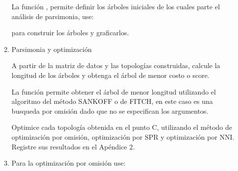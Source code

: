 \begin{itemize}
\begin{enumerate}
La funci\'on  , permite definir los \'arboles iniciales de los cuales parte el an\'alisis de parsimonia, use:


para construir los \'arboles y graficarlos.


\item{Parsimonia y optimizaci\'on}
 
A partir de la matriz de datos  y las topolog\'ias construidas,  calcule la longitud  de los \'arboles y obtenga el \'arbol de menor costo o score.

La funci\'on  permite obtener el \'arbol de menor longitud utilizando el algoritmo del m\'etodo SANKOFF o de FITCH,  en este caso es una busqueda por omisi\'on dado que no se especifican los argumentos.
 

Optimice cada topolog\'ia obtenida en el punto C,  utilizando el m\'etodo de optimizaci\'on por omisi\'on,  optimizaci\'on por SPR y optimizaci\'on por NNI. Registre sus resultados en el Ap\'endice 2.

\item Para la optimizaci\'on por omisi\'on use:



\end{enumerate}
\end{itemize}
